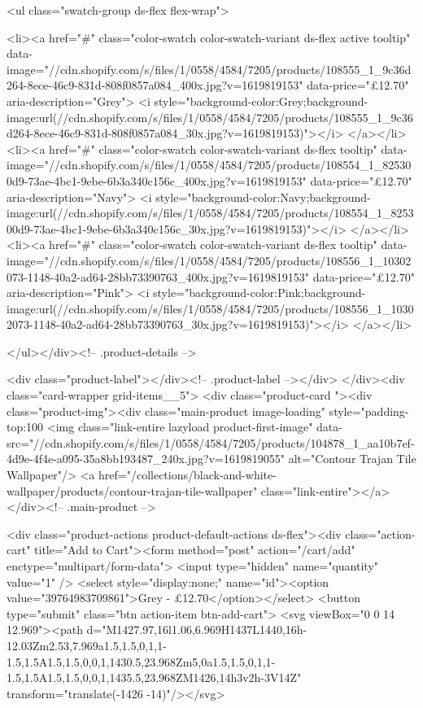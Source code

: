 {{{{{{{<ul class="swatch-group ds-flex flex-wrap">
        
<li><a href="#" class="color-swatch color-swatch-variant ds-flex active tooltip" data-image="//cdn.shopify.com/s/files/1/0558/4584/7205/products/108555_1_9c36d264-8ece-46c9-831d-808f0857a084_400x.jpg?v=1619819153" data-price="£12.70" aria-description="Grey">
              <i style="background-color:Grey;background-image:url(//cdn.shopify.com/s/files/1/0558/4584/7205/products/108555_1_9c36d264-8ece-46c9-831d-808f0857a084_30x.jpg?v=1619819153)"></i>
            </a></li>
<li><a href="#" class="color-swatch color-swatch-variant ds-flex tooltip" data-image="//cdn.shopify.com/s/files/1/0558/4584/7205/products/108554_1_825300d9-73ae-4bc1-9ebe-6b3a340c156c_400x.jpg?v=1619819153" data-price="£12.70" aria-description="Navy">
              <i style="background-color:Navy;background-image:url(//cdn.shopify.com/s/files/1/0558/4584/7205/products/108554_1_825300d9-73ae-4bc1-9ebe-6b3a340c156c_30x.jpg?v=1619819153)"></i>
            </a></li>
<li><a href="#" class="color-swatch color-swatch-variant ds-flex tooltip" data-image="//cdn.shopify.com/s/files/1/0558/4584/7205/products/108556_1_10302073-1148-40a2-ad64-28bb73390763_400x.jpg?v=1619819153" data-price="£12.70" aria-description="Pink">
              <i style="background-color:Pink;background-image:url(//cdn.shopify.com/s/files/1/0558/4584/7205/products/108556_1_10302073-1148-40a2-ad64-28bb73390763_30x.jpg?v=1619819153)"></i>
            </a></li>

      </ul></div><!-- .product-details -->

<div class="product-label"></div><!-- .product-label --></div>
          </div><div class="card-wrapper grid-items__5">
            <div class="product-card "><div class="product-img"><div class="main-product image-loading" style="padding-top:100%
      <img class="link-entire lazyload product-first-image" data-src="//cdn.shopify.com/s/files/1/0558/4584/7205/products/104878_1_aa10b7ef-4d9e-4f4e-a095-35a8bb193487_240x.jpg?v=1619819055" alt="Contour Trajan Tile Wallpaper"/>
      <a href="/collections/black-and-white-wallpaper/products/contour-trajan-tile-wallpaper" class="link-entire"></a>
    </div><!-- .main-product -->
  
<div class="product-actions product-default-actions ds-flex"><div class="action-cart" title="Add to Cart"><form method="post" action="/cart/add" enctype="multipart/form-data">
            <input type="hidden" name="quantity" value="1" />
            <select style="display:none;" name="id"><option value="39764983709861">Grey - £12.70</option></select>
            <button type="submit" class="btn action-item btn-add-cart">
              <svg viewBox="0 0 14 12.969"><path d="M1427.97,16l1.06,6.969H1437L1440,16h-12.03Zm2.53,7.969a1.5,1.5,0,1,1-1.5,1.5A1.5,1.5,0,0,1,1430.5,23.968Zm5,0a1.5,1.5,0,1,1-1.5,1.5A1.5,1.5,0,0,1,1435.5,23.968ZM1426,14h3v2h-3V14Z" transform="translate(-1426 -14)"/></svg>

}}}}}}}
